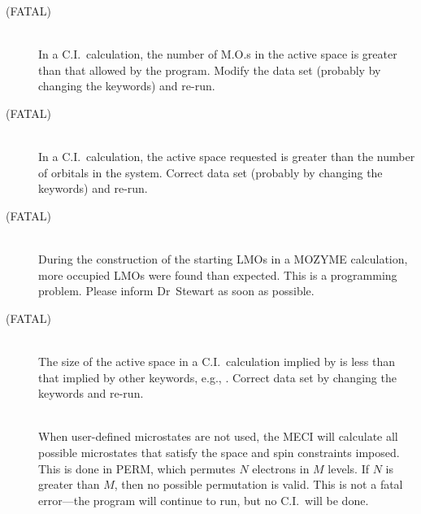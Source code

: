 \begin{description}
\item[ (FATAL)]~\\
In a C.I.\ calculation, the number of M.O.s in the active space is greater
than that allowed by the program.
Modify the data set (probably by changing the keywords) and re-run. 

\item[ (FATAL)]~\\
In a C.I.\ calculation, the active space requested is greater than the
number of orbitals in the system.
Correct data set (probably by changing the keywords) and re-run. 

\item[ (FATAL)]~\\
During the construction of the starting LMOs in a MOZYME calculation, more occupied
LMOs were found than expected.  This is a programming problem.
Please inform Dr~Stewart as soon as possible.


\item[ (FATAL)]~\\
The size of the active space in a C.I.\ calculation implied by 
is less than that implied by other keywords, e.g., .
Correct data set by changing the keywords and re-run.

\item[]~\\
When user-defined microstates are not used, the MECI will calculate all 
possible  microstates  that  satisfy the space and spin constraints imposed. 
This is done in PERM, which permutes $N$ electrons in $M$  levels. If  $N$ is
greater than $M$, then no possible permutation is valid.  This is not a fatal
error---the program will continue to run, but  no  C.I.\ will be done.
                  

\end{description}
